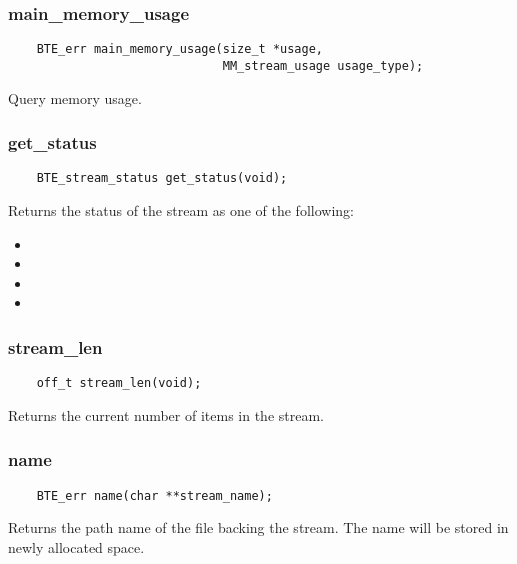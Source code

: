 \subsubsection{main\_memory\_usage}
\begin{verbatim}
    BTE_err main_memory_usage(size_t *usage,
                              MM_stream_usage usage_type);
\end{verbatim}
Query memory usage.



\subsubsection{get\_status}
\begin{verbatim}
    BTE_stream_status get_status(void);
\end{verbatim}
Returns the status of the stream as one
of the following:
\begin{itemize}
\item {}
\item {}
\item {}
\item {}
\end{itemize}


\subsubsection{stream\_len}
\begin{verbatim}
    off_t stream_len(void);
\end{verbatim}
Returns the current number of items in the stream.


\subsubsection{name}
\begin{verbatim}
    BTE_err name(char **stream_name);
\end{verbatim}
Returns the path name of the file backing the stream. The name will be
stored in newly allocated space.



